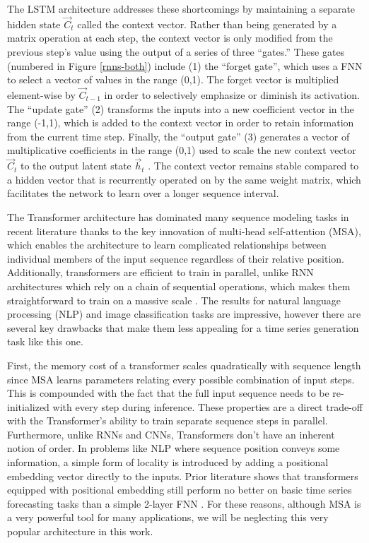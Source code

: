 The LSTM architecture addresses these shortcomings by maintaining a separate hidden state $\vec{C}_t$ called the context vector. Rather than being generated by a matrix operation at each step, the context vector is only modified from the previous step's value using the output of a series of three ``gates.'' These gates (numbered in Figure \ref{rnns-both})  include (1) the ``forget gate'', which uses a FNN to select a vector of values in the range (0,1). The forget vector is multiplied element-wise by $\vec{C}_{t-1}$ in order to selectively emphasize or diminish its activation. The ``update gate'' (2) transforms the inputs into a new coefficient vector in the range (-1,1), which is added to the context vector in order to retain information from the current time step. Finally, the ``output gate'' (3) generates a vector of multiplicative coefficients in the range (0,1) used to scale the new context vector $\vec{C}_t$ to the output latent state $\vec{h}_t$ \parencite{hochreiter_long_1997}. The context vector remains stable compared to a hidden vector that is recurrently operated on by the same weight matrix, which facilitates the network to learn over a longer sequence interval.

The Transformer architecture has dominated many sequence modeling tasks in recent literature thanks to the key innovation of multi-head self-attention (MSA), which enables the architecture to learn complicated relationships between individual members of the input sequence regardless of their relative position. Additionally, transformers are efficient to train in parallel, unlike RNN architectures which rely on a chain of sequential operations, which makes them straightforward to train on a massive scale \parencite{vaswani_attention_2017}. The results for natural language processing (NLP) \parencite{devlin_bert_2019} and image classification \parencite{dosovitskiy_image_2021} tasks are impressive, however there are several key drawbacks that make them less appealing for a time series generation task like this one.

First, the memory cost of a transformer scales quadratically with sequence length since MSA learns parameters relating every possible combination of input steps. This is compounded with the fact that the full input sequence needs to be re-initialized with every step during inference. These properties are a direct trade-off with the Transformer's ability to train separate sequence steps in parallel. Furthermore, unlike RNNs and CNNs, Transformers don't have an inherent notion of order. In problems like NLP where sequence position conveys some information, a simple form of locality is introduced by adding a positional embedding vector directly to the inputs. Prior literature shows that transformers equipped with positional embedding still perform no better on basic time series forecasting tasks than a simple 2-layer FNN \parencite{zeng_are_2022}. For these reasons, although MSA is a very powerful tool for many applications, we will be neglecting this very popular architecture in this work.
